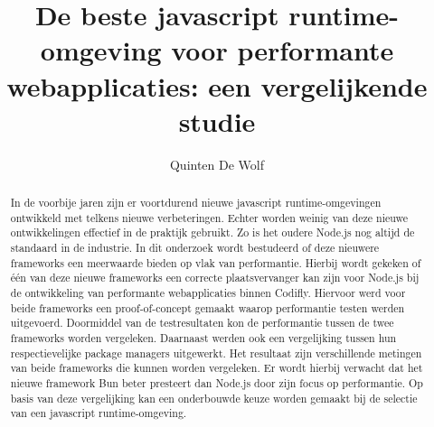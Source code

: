 \documentclass{hogent-article}
\title{De beste javascript runtime-omgeving voor performante webapplicaties: een vergelijkende studie}
\author{Quinten De Wolf}
\begin{document}
\begin{abstract}
  In de voorbije jaren zijn er voortdurend nieuwe javascript runtime-omgevingen ontwikkeld met telkens nieuwe verbeteringen. 
  Echter worden weinig van deze nieuwe ontwikkelingen effectief in de praktijk gebruikt.
  Zo is het oudere Node.js nog altijd de standaard in de industrie. 
  In dit onderzoek wordt bestudeerd of deze nieuwere frameworks een meerwaarde bieden op vlak van performantie. 
  Hierbij wordt gekeken of één van deze nieuwe frameworks  
  een correcte plaatsvervanger kan zijn voor Node.js bij de ontwikkeling van performante webapplicaties binnen Codifly.
  Hiervoor werd voor beide frameworks een proof-of-concept gemaakt waarop performantie testen werden uitgevoerd.
  Doormiddel van de testresultaten kon de performantie tussen de twee frameworks worden vergeleken.
  Daarnaast werden ook een vergelijking tussen hun respectievelijke package managers uitgewerkt. 
  Het resultaat zijn verschillende metingen van beide frameworks die kunnen worden vergeleken.
  Er wordt hierbij verwacht dat het nieuwe framework Bun beter presteert dan Node.js door zijn focus op performantie.
  Op basis van deze vergelijking kan een onderbouwde keuze worden gemaakt bij de selectie van een javascript runtime-omgeving.

\end{abstract}

\tableofcontents



\printbibliography[heading=bibintoc]
\end{document}
